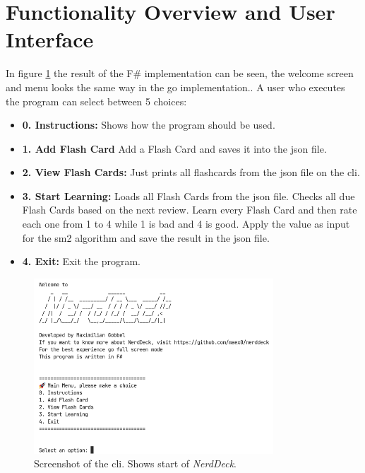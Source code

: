     \section{Functionality Overview and User Interface}
    In figure \ref{fig:screenshotcli} the result of the F\# implementation can be seen, the welcome screen and menu looks the same way in the go implementation.. A user who executes the program can select between 5 choices:        
    \begin{itemize}
        \item \textbf{0. Instructions:} Shows how the program should be used.
        \item \textbf{1. Add Flash Card} Add a Flash Card and saves it into the \ac{json} file.
        \item \textbf{2. View Flash Cards:} Just prints all flashcards from the \ac{json} file on the \ac{cli}.
        \item \textbf{3. Start Learning:} Loads all Flash Cards from the \ac{json} file. Checks all due Flash Cards based on the next review. Learn every Flash Card and then rate each one from 1 to 4 while 1 is bad and 4 is good. Apply the value as input for the \ac{sm2} algorithm and save the result in the \ac{json} file.
        \item \textbf{4. Exit:} Exit the program.
    \end{itemize}

    \begin{figure}
        \centering
        \includegraphics[width=0.8\textwidth]{ScreenshotNerdDeck.png}
        \caption{Screenshot of the \ac{cli}. Shows start of \textit{NerdDeck}.}
        \label{fig:screenshotcli}
    \end{figure}


